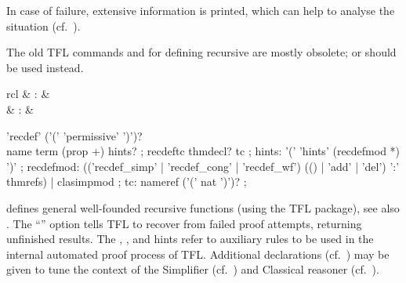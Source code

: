 \begin{isabellebody}
\begin{isamarkuptext}
\begin{descr}
  In case of failure, extensive information is printed, which can help
  to analyse the situation (cf.\ \cite{isabelle-function}).

  \end{descr}%
\end{isamarkuptext}%
\isamarkuptrue%
%
\isamarkuptrue%
%
\begin{isamarkuptext}%
The old TFL commands \hyperlink{command.HOL.recdef}{\mbox{}} and \hyperlink{command.HOL.recdef-tc}{\mbox{}} for defining recursive are mostly obsolete; \hyperlink{command.HOL.function}{\mbox{}} or \hyperlink{command.HOL.fun}{\mbox{}} should be used instead.

  \begin{matharray}{rcl}
    \hypertarget{command.HOL.recdef}{\hyperlink{command.HOL.recdef}{\mbox{}}} & : &  \\
    \hypertarget{command.HOL.recdef-tc}{\hyperlink{command.HOL.recdef-tc}{\mbox{}}}\isa{{\isachardoublequote}\isactrlsup {\isacharasterisk}{\isachardoublequote}} & : &  \\
  \end{matharray}

  \begin{rail}
    'recdef' ('(' 'permissive' ')')? \\ name term (prop +) hints?
    ;
    recdeftc thmdecl? tc
    ;
    hints: '(' 'hints' (recdefmod *) ')'
    ;
    recdefmod: (('recdef\_simp' | 'recdef\_cong' | 'recdef\_wf') (() | 'add' | 'del') ':' thmrefs) | clasimpmod
    ;
    tc: nameref ('(' nat ')')?
    ;
  \end{rail}

  \begin{descr}
  
  \item [\hyperlink{command.HOL.recdef}{\mbox{\isa{\isacommand{recdef}}}}] defines general well-founded
  recursive functions (using the TFL package), see also
  \cite{isabelle-HOL}.  The ``'' option tells
  TFL to recover from failed proof attempts, returning unfinished
  results.  The , , and  hints refer to auxiliary rules to be used in the internal
  automated proof process of TFL.  Additional \hyperlink{syntax.clasimpmod}{\mbox{}}
  declarations (cf.\ ) may be given to tune the
  context of the Simplifier (cf.\ ) and
  Classical reasoner (cf.\ ).
  

\end{descr}
\end{isamarkuptext}
\end{isabellebody}
